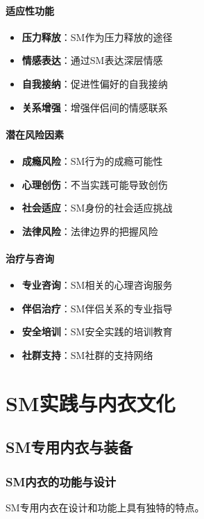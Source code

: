 \documentclass[12pt,UTF8]{ctexbook}
\begin{document}
\subsection{适应性功能}
\begin{itemize}[leftmargin=2cm]
	\item \textbf{压力释放}：SM作为压力释放的途径
	\item \textbf{情感表达}：通过SM表达深层情感
	\item \textbf{自我接纳}：促进性偏好的自我接纳
	\item \textbf{关系增强}：增强伴侣间的情感联系
\end{itemize}

\subsection{潜在风险因素}
\begin{itemize}[leftmargin=2cm]
	\item \textbf{成瘾风险}：SM行为的成瘾可能性
	\item \textbf{心理创伤}：不当实践可能导致创伤
	\item \textbf{社会适应}：SM身份的社会适应挑战
	\item \textbf{法律风险}：法律边界的把握风险
\end{itemize}

\subsection{治疗与咨询}
\begin{itemize}[leftmargin=2cm]
	\item \textbf{专业咨询}：SM相关的心理咨询服务
	\item \textbf{伴侣治疗}：SM伴侣关系的专业指导
	\item \textbf{安全培训}：SM安全实践的培训教育
	\item \textbf{社群支持}：SM社群的支持网络
\end{itemize}

\part{SM实践与内衣文化}

\chapter{SM专用内衣与装备}
\section{SM内衣的功能与设计}
SM专用内衣在设计和功能上具有独特的特点。
\end{document}
